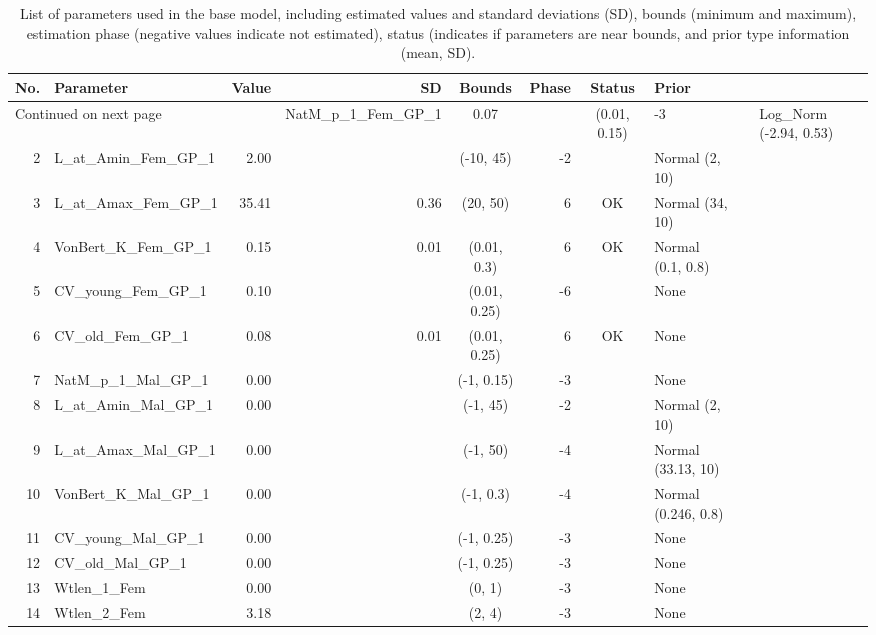 \documentclass[12pt,]{article}
\begin{document}
\begin{landscape}
\begin{longtable}{rlrrcrcl}
\caption{List of parameters used in
                                              the base model, including estimated 
                                              values and standard deviations (SD), 
                                              bounds (minimum and maximum), 
                                              estimation phase (negative values indicate
                                              not estimated), status (indicates if 
                                              parameters are near bounds, and prior type
                                              information (mean, SD).} \\ 
  \hline
No. & Parameter & Value & SD & Bounds & Phase & Status & Prior \\ 
  \hline 
\endhead 
\hline 
\multicolumn{3}{l}{\footnotesize Continued on next page} 
\endfoot 
\endlastfoot 
 \hline
1 & NatM\_p\_1\_Fem\_GP\_1 & 0.07 &  & (0.01, 0.15) & -3 &  & Log\_Norm (-2.94, 0.53) \\ 
  2 & L\_at\_Amin\_Fem\_GP\_1 & 2.00 &  & (-10, 45) & -2 &  & Normal (2, 10) \\ 
  3 & L\_at\_Amax\_Fem\_GP\_1 & 35.41 & 0.36 & (20, 50) & 6 & OK & Normal (34, 10) \\ 
  4 & VonBert\_K\_Fem\_GP\_1 & 0.15 & 0.01 & (0.01, 0.3) & 6 & OK & Normal (0.1, 0.8) \\ 
  5 & CV\_young\_Fem\_GP\_1 & 0.10 &  & (0.01, 0.25) & -6 &  & None \\ 
  6 & CV\_old\_Fem\_GP\_1 & 0.08 & 0.01 & (0.01, 0.25) & 6 & OK & None \\ 
  7 & NatM\_p\_1\_Mal\_GP\_1 & 0.00 &  & (-1, 0.15) & -3 &  & None \\ 
  8 & L\_at\_Amin\_Mal\_GP\_1 & 0.00 &  & (-1, 45) & -2 &  & Normal (2, 10) \\ 
  9 & L\_at\_Amax\_Mal\_GP\_1 & 0.00 &  & (-1, 50) & -4 &  & Normal (33.13, 10) \\ 
  10 & VonBert\_K\_Mal\_GP\_1 & 0.00 &  & (-1, 0.3) & -4 &  & Normal (0.246, 0.8) \\ 
  11 & CV\_young\_Mal\_GP\_1 & 0.00 &  & (-1, 0.25) & -3 &  & None \\ 
  12 & CV\_old\_Mal\_GP\_1 & 0.00 &  & (-1, 0.25) & -3 &  & None \\ 
  13 & Wtlen\_1\_Fem & 0.00 &  & (0, 1) & -3 &  & None \\ 
  14 & Wtlen\_2\_Fem & 3.18 &  & (2, 4) & -3 &  & None \\ 

\end{longtable}
\end{landscape}
\end{document}
